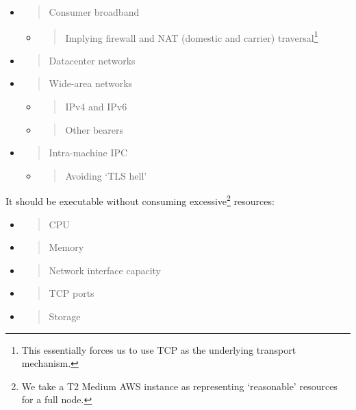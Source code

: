 \documentclass[11pt,a4paper]{article}
\begin{document}
\begin{itemize}
\item
  \begin{quote}
  Consumer broadband
  \end{quote}

  \begin{itemize}
  \item
    \begin{quote}
    Implying firewall and NAT (domestic and carrier) traversal\footnote{This
      essentially forces us to use TCP as the underlying transport
      mechanism.}
    \end{quote}
  \end{itemize}
\item
  \begin{quote}
  Datacenter networks
  \end{quote}
\item
  \begin{quote}
  Wide-area networks
  \end{quote}

  \begin{itemize}
  \item
    \begin{quote}
    IPv4 and IPv6
    \end{quote}
  \item
    \begin{quote}
    Other bearers
    \end{quote}
  \end{itemize}
\item
  \begin{quote}
  Intra-machine IPC
  \end{quote}

  \begin{itemize}
  \item
    \begin{quote}
    Avoiding `TLS hell'
    \end{quote}
  \end{itemize}
\end{itemize}

It should be executable without consuming excessive\footnote{We take a
  T2 Medium AWS instance as representing `reasonable' resources for a
  full node.} resources:

\begin{itemize}
\item
  \begin{quote}
  CPU
  \end{quote}
\item
  \begin{quote}
  Memory
  \end{quote}
\item
  \begin{quote}
  Network interface capacity
  \end{quote}
\item
  \begin{quote}
  TCP ports
  \end{quote}
\item
  \begin{quote}
  Storage
  \end{quote}
\end{itemize}
\end{document}
